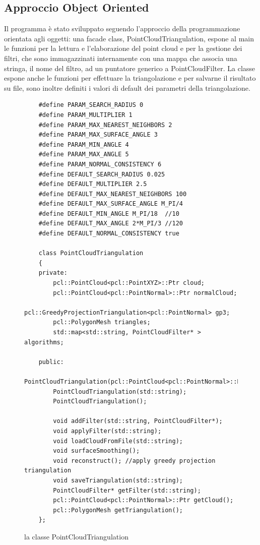 \documentclass[a4paper,12pt]{article}
\begin{document}
	\subsection{Approccio Object Oriented}
	Il programma è stato sviluppato seguendo l'approccio della programmazione orientata agli oggetti: 
	una facade class, PointCloudTriangulation, espone al main le funzioni per la lettura  e l'elaborazione del point cloud
	e per la gestione dei filtri, che sono immagazzinati internamente con una mappa che associa una stringa, 
	il nome del filtro, ad un puntatore generico a PointCloudFilter.	
	La classe espone anche le funzioni per effettuare la triangolazione e per salvarne il risultato su file, sono
	inoltre definiti i valori di default dei parametri della triangolazione.
	\begin{figure}[H]	
	\begin{lstlisting}	
	#define PARAM_SEARCH_RADIUS 0
	#define PARAM_MULTIPLIER 1
	#define PARAM_MAX_NEAREST_NEIGHBORS 2
	#define PARAM_MAX_SURFACE_ANGLE 3
	#define PARAM_MIN_ANGLE 4
	#define PARAM_MAX_ANGLE 5
	#define PARAM_NORMAL_CONSISTENCY 6	
	#define DEFAULT_SEARCH_RADIUS 0.025
	#define DEFAULT_MULTIPLIER 2.5
	#define DEFAULT_MAX_NEAREST_NEIGHBORS 100
	#define DEFAULT_MAX_SURFACE_ANGLE M_PI/4 
	#define DEFAULT_MIN_ANGLE M_PI/18  //10
	#define DEFAULT_MAX_ANGLE 2*M_PI/3 //120
	#define DEFAULT_NORMAL_CONSISTENCY true
	
	class PointCloudTriangulation
	{
	private:
    	pcl::PointCloud<pcl::PointXYZ>::Ptr cloud;
    	pcl::PointCloud<pcl::PointNormal>::Ptr normalCloud;
    	pcl::GreedyProjectionTriangulation<pcl::PointNormal> gp3;
    	pcl::PolygonMesh triangles;
    	std::map<std::string, PointCloudFilter* > algorithms;
    
	public:
   		PointCloudTriangulation(pcl::PointCloud<pcl::PointNormal>::Ptr);
    	PointCloudTriangulation(std::string);
    	PointCloudTriangulation();

	    void addFilter(std::string, PointCloudFilter*);
    	void applyFilter(std::string);
    	void loadCloudFromFile(std::string);
    	void surfaceSmoothing();
    	void reconstruct(); //apply greedy projection triangulation
    	void saveTriangulation(std::string);
    	PointCloudFilter* getFilter(std::string);
    	pcl::PointCloud<pcl::PointNormal>::Ptr getCloud();
    	pcl::PolygonMesh getTriangulation();    
	};	
	\end{lstlisting}
	\label{fig:PointCloudTriangulation}
	\caption{la classe PointCloudTriangulation}
	\end{figure}
	\clearpage
	
\end{document}
